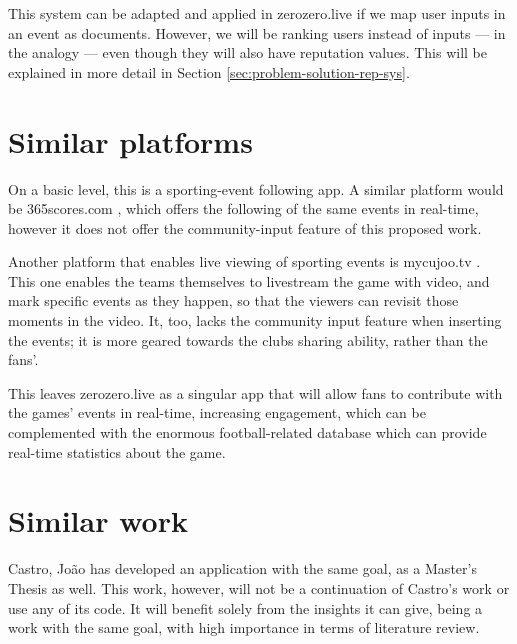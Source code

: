 \begin{enumerate}
    This system can be adapted and applied in zerozero.live if we map user inputs in an event as documents. However, we will be ranking users instead of inputs ---  in the analogy --- even though they will also have reputation values. This will be explained in more detail in Section \ref{sec:problem-solution-rep-sys}.
    
\end{enumerate} 

\section{Similar platforms}

On a basic level, this is a sporting-event following app. A similar platform would be 365scores.com \cite{365scores-about}, which offers the following of the same events in real-time, however it does not offer the community-input feature of this proposed work.

Another platform that enables live viewing of sporting events is mycujoo.tv \cite{mycujoo-about}. This one enables the teams themselves to livestream the game with video, and mark specific events as they happen, so that the viewers can revisit those moments in the video. It, too, lacks the community input feature when inserting the events; it is more geared towards the clubs sharing ability, rather than the fans'. 

This leaves zerozero.live as a singular app that will allow fans to contribute with the games' events in real-time, increasing engagement, which can be complemented with the enormous football-related database which can provide real-time statistics about the game.

\section{Similar work}

Castro, João \cite{PedroSousaCastro2020} has developed an application with the same goal, as a Master's Thesis as well. This work, however, will not be a continuation of Castro's work or use any of its code. It will benefit solely from the insights it can give, being a work with the same goal, with high importance in terms of literature review.

